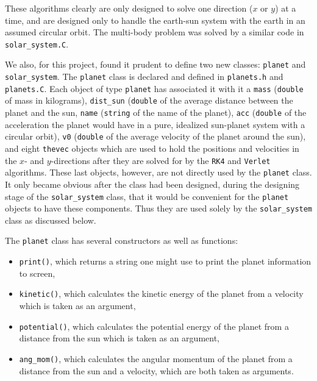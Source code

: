 \documentclass[12pt]{article}
\numberwithin{equation}{section}
\begin{document}
\noindent These algorithms clearly are only designed to solve one direction ($x$ or $y$) at a time, and are designed only to handle the earth-sun system with the earth in an assumed circular orbit.  The multi-body problem was solved by a similar code in \texttt{solar\_system.C}.
\par We also, for this project, found it prudent to define two new classes: \texttt{planet} and \texttt{solar\_system}.  The \texttt{planet} class is declared and defined in \texttt{planets.h} and \texttt{planets.C}.  Each object of type \texttt{planet} has associated it with it a \texttt{mass} (\texttt{double} of mass in kilograms), \texttt{dist\_sun} (\texttt{double} of the average distance between the planet and the sun, \texttt{name} (\texttt{string} of the name of the planet), \texttt{acc} (\texttt{double} of the acceleration the planet would have in a pure, idealized sun-planet system with a circular orbit), \texttt{v0} (\texttt{double} of the average velocity of the planet around the sun), and eight \texttt{thevec} objects which are used to hold the positions and velocities in the $x$- and $y$-directions after they are solved for by the \texttt{RK4} and \texttt{Verlet} algorithms.  These last objects, however, are not directly used by the \texttt{planet} class.  It only became obvious after the class had been designed, during the designing stage of the \texttt{solar\_system} class, that it would be convenient for the \texttt{planet} objects to have these components.  Thus they are used solely by the \texttt{solar\_system} class as discussed below. 
\par The \texttt{planet} class has several constructors as well as functions:

\begin{itemize}
\item \texttt{print()}, which returns a string one might use to print the planet information to screen,
\item \texttt{kinetic()}, which calculates the kinetic energy of the planet from a velocity which is taken as an argument,
\item \texttt{potential()}, which calculates the potential energy of the planet from a distance from the sun which is taken as an argument,
\item \texttt{ang\_mom()}, which calculates the angular momentum of the planet from a distance from the sun and a velocity, which are both taken as arguments.
\end{itemize}
\end{document}

